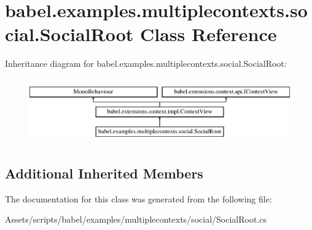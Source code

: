 \hypertarget{classbabel_1_1examples_1_1multiplecontexts_1_1social_1_1_social_root}{\section{babel.\-examples.\-multiplecontexts.\-social.\-Social\-Root Class Reference}
\label{classbabel_1_1examples_1_1multiplecontexts_1_1social_1_1_social_root}
}
Inheritance diagram for babel.\-examples.\-multiplecontexts.\-social.\-Social\-Root\-:\begin{figure}[H]
\begin{center}
\leavevmode
\includegraphics[height=2.800000cm]{classbabel_1_1examples_1_1multiplecontexts_1_1social_1_1_social_root}
\end{center}
\end{figure}
\subsection*{Additional Inherited Members}


The documentation for this class was generated from the following file\-:\begin{DoxyCompactItemize}
\item 
Assets/scripts/babel/examples/multiplecontexts/social/Social\-Root.\-cs\end{DoxyCompactItemize}
